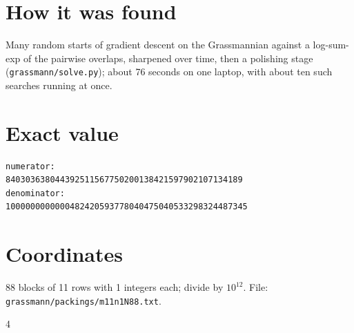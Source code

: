 \documentclass[11pt,a4paper]{article}
\begin{document}
\section{How it was found}
Many random starts of gradient descent on the Grassmannian against a log-sum-exp of the pairwise overlaps, sharpened over time, then a polishing stage (\texttt{grassmann/solve.py}); about 76 seconds on one laptop, with about ten such searches running at once.


\appendix
\section{Exact value}
{\small
\begin{verbatim}
numerator:
840303638044392511567750200138421597902107134189
denominator:
1000000000000482420593778040475040533298324487345
\end{verbatim}}

\section{Coordinates}
88 blocks of 11 rows with 1 integers each; divide by $10^{12}$. File: \texttt{grassmann/packings/m11n1N88.txt}.
{\tiny
\begin{multicols}{4}
\end{multicols}}
\end{document}
